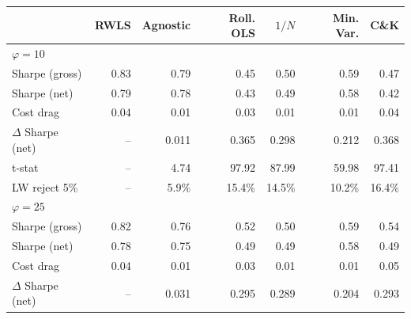 \begin{tabular*}{\textwidth}{l@{\extracolsep{\fill}}rrrrrr}
\toprule
 & RWLS & Agnostic & Roll. OLS & $1/N$ & Min. Var. & C\&K \\
\midrule
\multicolumn{7}{l}{\textit{$\varphi = 10$}} \\
\midrule
Sharpe (gross) & 0.83\phantom{$^{***}$} & 0.79\phantom{$^{***}$} & 0.45\phantom{$^{***}$} & 0.50\phantom{$^{***}$} & 0.59\phantom{$^{***}$} & 0.47\phantom{$^{***}$} \\
Sharpe (net) & 0.79\phantom{$^{***}$} & 0.78\phantom{$^{***}$} & 0.43\phantom{$^{***}$} & 0.49\phantom{$^{***}$} & 0.58\phantom{$^{***}$} & 0.42\phantom{$^{***}$} \\
Cost drag & 0.04\phantom{$^{***}$} & 0.01\phantom{$^{***}$} & 0.03\phantom{$^{***}$} & 0.01\phantom{$^{***}$} & 0.01\phantom{$^{***}$} & 0.04\phantom{$^{***}$} \\
$\Delta$ Sharpe (net) & --\phantom{$^{***}$} & 0.011\rlap{$^{***}$}\phantom{$^{***}$} & 0.365\rlap{$^{***}$}\phantom{$^{***}$} & 0.298\rlap{$^{***}$}\phantom{$^{***}$} & 0.212\rlap{$^{***}$}\phantom{$^{***}$} & 0.368\rlap{$^{***}$}\phantom{$^{***}$} \\
t-stat & --\phantom{$^{***}$} & 4.74\phantom{$^{***}$} & 97.92\phantom{$^{***}$} & 87.99\phantom{$^{***}$} & 59.98\phantom{$^{***}$} & 97.41\phantom{$^{***}$} \\
LW reject 5\% & --\phantom{$^{***}$} & 5.9\%\phantom{$^{***}$} & 15.4\%\phantom{$^{***}$} & 14.5\%\phantom{$^{***}$} & 10.2\%\phantom{$^{***}$} & 16.4\%\phantom{$^{***}$} \\
\midrule
\multicolumn{7}{l}{\textit{$\varphi = 25$}} \\
\midrule
Sharpe (gross) & 0.82\phantom{$^{***}$} & 0.76\phantom{$^{***}$} & 0.52\phantom{$^{***}$} & 0.50\phantom{$^{***}$} & 0.59\phantom{$^{***}$} & 0.54\phantom{$^{***}$} \\
Sharpe (net) & 0.78\phantom{$^{***}$} & 0.75\phantom{$^{***}$} & 0.49\phantom{$^{***}$} & 0.49\phantom{$^{***}$} & 0.58\phantom{$^{***}$} & 0.49\phantom{$^{***}$} \\
Cost drag & 0.04\phantom{$^{***}$} & 0.01\phantom{$^{***}$} & 0.03\phantom{$^{***}$} & 0.01\phantom{$^{***}$} & 0.01\phantom{$^{***}$} & 0.05\phantom{$^{***}$} \\
$\Delta$ Sharpe (net) & --\phantom{$^{***}$} & 0.031\rlap{$^{***}$}\phantom{$^{***}$} & 0.295\rlap{$^{***}$}\phantom{$^{***}$} & 0.289\rlap{$^{***}$}\phantom{$^{***}$} & 0.204\rlap{$^{***}$}\phantom{$^{***}$} & 0.293\rlap{$^{***}$}\phantom{$^{***}$} \\

\end{tabular*}
